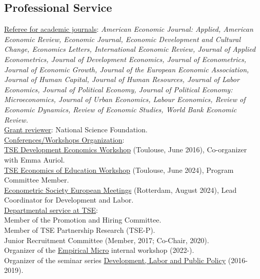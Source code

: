 \documentclass[12pt,english]{article}
\begin{document}
\subsection*{Professional Service}

\noindent \underline{Referee for academic journals}: \textit{American Economic Journal: Applied, American Economic Review, Economic Journal, Economic Development and Cultural Change, Economics Letters, International Economic Review, Journal of Applied Econometrics, Journal of Development Economics, Journal of Econometrics, Journal of Economic Growth, Journal of the European Economic Association, Journal of Human Capital, Journal of Human Resources, Journal of Labor Economics, Journal of Political Economy,  Journal of Political Economy: Microeconomics, Journal of Urban Economics, Labour Economics, Review of Economic Dynamics, Review of Economic Studies, World Bank Economic Review.} \\

\noindent \underline{Grant reviewer}: National Science Foundation. \\

\noindent \underline{Conferences/Workshops Organization}:\\
\href{https://www.tse-fr.eu/sites/default/files/TSE/documents/sem2016/development/development_workshop_program_130616.pdf}{TSE Development Economics Workshop} (Toulouse, June 2016), Co-organizer with Emma Auriol.\vspace{0.2cm} \\
\href{https://www.tse-fr.eu/conferences/2024-economics-education-workshop}{TSE Economics of Education Workshop} (Toulouse, June 2024), Program Committee Member. \vspace{0.2cm} \\
\href{https://www.eea-esem-congresses.org/}{Econometric Society European Meetings} (Rotterdam, August 2024), Lead Coordinator for Development and Labor.\vspace{0.2cm}\\



\noindent \underline{Departmental service at TSE}: \\
Member of the Promotion and Hiring Committee.\vspace{0.2cm}\\
Member of TSE Partnership Research (TSE-P). \vspace{0.2cm}\\
Junior Recruitment Committee (Member, 2017; Co-Chair, 2020).\vspace{0.2cm}\\
Organizer of the \href{https://docs.google.com/spreadsheets/d/1Z6tqVkldZ2Krq17VPvkmUZKwPWXQqJWvTQpuXFb9eBM/edit#gid=1008089500} {Empirical Micro} internal workshop (2022-).\vspace{0.2cm}\\
Organizer of the seminar series \href{https://www.tse-fr.eu/groups/development-economics?tabs=4}{Development, Labor and Public Policy} (2016-2019).
\end{document}
